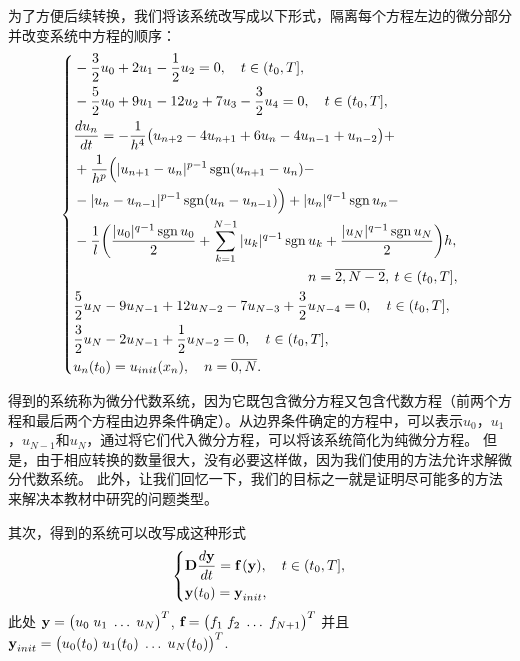 \documentclass[twoside]{book}
\DeclareMathOperator{\sign}{sgn}
\def\textbf{\bf}%
\begin{document}
\begin{CJK*}{GBK}{song}
为了方便后续转换，我们将该系统改写成以下形式，隔离每个方程左边的微分部分并改变系统中方程的顺序：
\begin{equation*}
\left\{
\begin{aligned}
&-\dfrac{3}{2} u_0 + 2 u_1 - \dfrac{1}{2} u_2 = 0, \quad t \in (t_0,T],\\
&-\dfrac{5}{2} u_0 + 9 u_1 - 12 u_2 + 7 u_3 - \dfrac{3}{2} u_4 = 0, \quad t \in (t_0,T],\\
&\dfrac{d u_{n}}{d t} = - \dfrac{1}{h^4}\big(u_{n + 2} - 4 u_{n + 1} + 6 u_{n} - 4 u_{n - 1} + u_{n - 2}\big) + \\
&+ \dfrac{1}{h^p}\Big(|u_{n + 1} - u_n|^{p - 1}\sign(u_{n + 1} - u_n) - \\
& - |u_{n} - u_{n - 1}|^{p - 1}\sign(u_{n} - u_{n - 1})\Big) + |u_n|^{q - 1} \sign u_n - \\
&- \dfrac{1}{l} \bigg(\dfrac{|u_0|^{q - 1} \sign u_0}{2} + \sum\limits_{k = 1}^{N - 1} |u_k|^{q - 1} \sign u_k  + \dfrac{|u_N|^{q - 1} \sign u_N}{2}\bigg)h, \\
&\hspace{+5.9cm} n = \overline{2,N - 2}, \: t \in (t_0,T], \\
&\dfrac{5}{2} u_N - 9 u_{N - 1} + 12 u_{N - 2} - 7 u_{N - 3} + \dfrac{3}{2} u_{N - 4} = 0, \quad t \in (t_0,T],\\
&\dfrac{3}{2} u_N - 2 u_{N - 1} + \dfrac{1}{2} u_{N - 2} = 0, \quad t \in (t_0,T],\\
&u_n(t_0) = u_{init}(x_n), \quad n = \overline{0,N}.
\end{aligned}
\right.
\end{equation*}

得到的系统称为微分代数系统，因为它既包含微分方程又包含代数方程（前两个方程和最后两个方程由边界条件确定）。从边界条件确定的方程中，可以表示$ u_0 $，$ u_1 $，$ u_ {N-1} $和$ u_N $，通过将它们代入微分方程，可以将该系统简化为纯微分方程。 但是，由于相应转换的数量很大，没有必要这样做，因为我们使用的方法允许求解微分代数系统。 此外，让我们回忆一下，我们的目标之一就是证明尽可能多的方法来解决本教材中研究的问题类型。

其次，得到的系统可以改写成这种形式
\begin{equation}
\label{Ch4_System_of_ODEs}
\left\{
\begin{aligned}
&\emph{\textbf{D}} \dfrac{d \emph{\textbf{y}}}{d t} = \emph{\textbf{f}} \, (\emph{\textbf{y}}), \quad t \in (t_0,T],\\
&\emph{\textbf{y}}(t_0) = \emph{\textbf{y}}_{init},
\end{aligned}
\right.
\end{equation}
此处 $\emph{\textbf{y}} = \big(u_0 \; u_1 \;  \ldots \; u_{N}\big)^T$, $\emph{\textbf{f}} = \big(f_1 \; f_2 \; \ldots \; f_{N + 1}\big)^T$ 并且 $\emph{\textbf{y}}_{init} = \big(u_0(t_0) \; u_1(t_0) \;  \ldots \; u_{N}(t_0)\big)^T$.


\end{CJK*}
\end{document}
